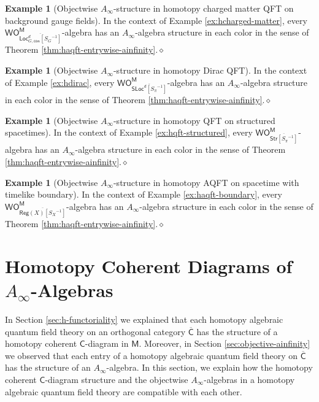 \documentclass{amsbook}
\numberwithin{section}{chapter}
\numberwithin{subsection}{section}
\numberwithin{equation}{section}
\theoremstyle{plain}
\theoremstyle{definition}
\newtheorem{example}[equation]{Example}
\newcommand{\C}{\mathsf{C}}
\newcommand{\M}{\mathsf{M}}
\renewcommand{\O}{\mathsf{O}}
\newcommand{\Otom}{\O^{\M}}
\newcommand{\W}{\mathsf{W}}
\newcommand{\dqed}{\hfill$\diamond$}
\newcommand{\inv}[1]{{#1}^{-1}}
\newcommand{\Cbar}{\overline{\C}}
\newcommand{\Bgconloc}{\Locd_{G,\mathsf{con}}}
\newcommand{\Bgconlocsginv}{\Bgconloc[\inv{S_G}]}
\newcommand{\Bgconlocsginvbar}{\overline{\Bgconlocsginv}}
\newcommand{\Loc}{\mathsf{Loc}}
\newcommand{\Locd}{\Loc^d}
\newcommand{\Reg}{\mathsf{Reg}}
\newcommand{\Regx}{\Reg(X)}
\newcommand{\Regxsinv}{\Regx[\inv{S_X}]}
\newcommand{\Regxsinvbar}{\overline{\Regxsinv}}
\newcommand{\Sloc}{\mathsf{SLoc}}
\newcommand{\Slocd}{\Sloc^d}
\newcommand{\Slocdsinv}{\Slocd[\inv{S_{\pi}}]}
\newcommand{\Slocdsinvbar}{\overline{\Slocdsinv}}
\newcommand{\Str}{\mathsf{Str}}
\newcommand{\Strsinv}{\Str[\inv{S_{\pi}}]}
\newcommand{\Strsinvbar}{\overline{\Strsinv}}
\newcommand{\wom}{\W\Otom}
\begin{document}
\begin{example}[Objectwise $A_\infty$-structure in homotopy charged matter QFT on background gauge fields]\label{ex:ainfinity-charged}
In the context of Example \ref{ex:hcharged-matter}, every  $\wom_{\Bgconlocsginvbar}$-algebra has an $A_\infty$-algebra structure in each color in the sense of Theorem \ref{thm:haqft-entrywise-ainfinity}.\dqed
\end{example}

\begin{example}[Objectwise $A_\infty$-structure in homotopy Dirac QFT]\label{ex:ainfinity-dirac}
In the context of Example \ref{ex:hdirac}, every  $\wom_{\Slocdsinvbar}$-algebra has an $A_\infty$-algebra structure in each color in the sense of Theorem \ref{thm:haqft-entrywise-ainfinity}.\dqed
\end{example}

\begin{example}[Objectwise $A_\infty$-structure in homotopy QFT on structured spacetimes]\label{ex:ainfinity-structured}
In the context of Example \ref{ex:hqft-structured}, every $\wom_{\Strsinvbar}$-algebra has an $A_\infty$-algebra structure in each color in the sense of Theorem \ref{thm:haqft-entrywise-ainfinity}.\dqed
\end{example}

\begin{example}[Objectwise $A_\infty$-structure in homotopy AQFT on spacetime with timelike boundary]\label{ex:ainfinity-boundary}
In the context of Example \ref{ex:haqft-boundary}, every $\wom_{\Regxsinvbar}$-algebra has an $A_\infty$-algebra structure in each color in the sense of Theorem \ref{thm:haqft-entrywise-ainfinity}.\dqed
\end{example}


\section{Homotopy Coherent Diagrams of $A_\infty$-Algebras}\label{sec:hcdiag-ainfinity}

In Section \ref{sec:h-functoriality} we explained that each homotopy algebraic quantum field theory on an orthogonal category $\Cbar$ has the structure of a homotopy coherent $\C$-diagram in $\M$.  Moreover, in Section \ref{sec:objective-ainfinity} we observed that each entry of a homotopy algebraic quantum field theory on $\Cbar$ has the structure of an $A_\infty$-algebra.  In this section, we explain how the homotopy coherent $\C$-diagram structure and the objectwise $A_\infty$-algebras in a homotopy algebraic quantum field theory are compatible with each other.
\end{document}
